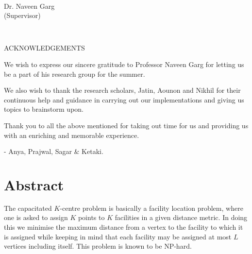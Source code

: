 \documentclass[12pt,a4paper,onecolumn]{article}
\begin{document}
\begin{titlepage}
\begin{minipage}{0.4\textwidth}
\begin{flushleft}
\end{flushleft}
\end{minipage}
~
\begin{minipage}{0.4\textwidth}
\begin{flushright} 

\large Dr. Naveen Garg \\
(Supervisor)%
\end{flushright}
\end{minipage}\\[2cm]



\newpage
\thispagestyle{empty}

\begin{center}


\LARGE ACKNOWLEDGEMENTS\\[2 cm]

\end{center}
\large \begin{flushleft}
We wish to express our sincere gratitude to Professor Naveen Garg for letting us be a part of his research group for the summer.\end{flushleft}
\begin{flushleft}We also wish to thank the research scholars, Jatin, Aounon and Nikhil for their continuous  help and guidance in carrying out our implementations and giving us topics to brainstorm upon.\end{flushleft} \begin{flushleft}Thank you to all the above mentioned for taking out time for us and providing us with an enriching and memorable experience.\end{flushleft} \begin{flushleft}

 - Anya, Prajwal, Sagar \& Ketaki.
\end{flushleft}

\end{titlepage}

\tableofcontents


\section{Abstract}
The capacitated $K$-centre problem is basically a facility location problem, where one is asked to assign $K$ points to $K$ facilities in a given distance metric. In doing this we minimise
the maximum distance from a vertex to the facility to which it is assigned while keeping in mind that each facility may be assigned at most $L$ vertices including itself. This problem is known to be NP-hard.
\end{document}
